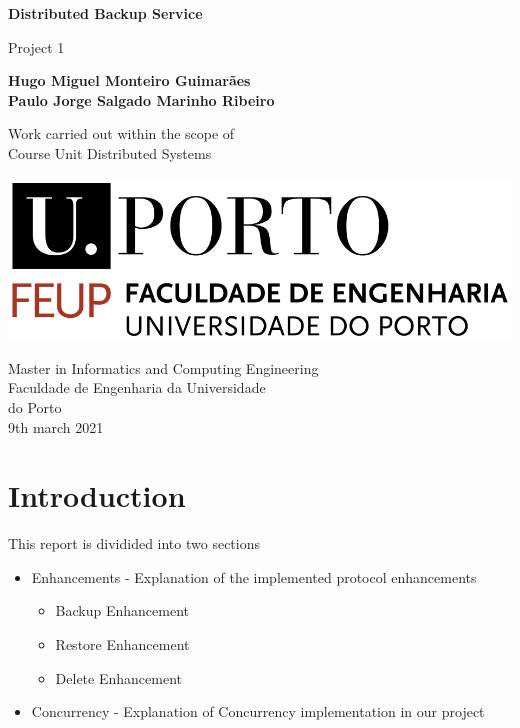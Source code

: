 \documentclass[11pt]{article}
\begin{document}
\begin{titlepage}
	\begin{center}
		\vspace*{1cm}
		
		\Large
		\textbf{Distributed Backup Service}
		
		\vspace{0.5cm}
		\large
		Project 1 
		
		\vspace{1.5cm}
		
		\textbf{Hugo Miguel Monteiro Guimarães}\\
		\textbf{Paulo Jorge Salgado Marinho Ribeiro}
		
		\vspace{4cm}
		
		Work carried out within the scope of \\
		Course Unit Distributed Systems
		
		\vspace{0.8cm}
		
		\includegraphics[width=0.4 \textwidth]{feup_logo.png}
		
		\vspace{1.5cm}		
		
		\large
		Master in Informatics and Computing Engineering\\
		Faculdade de Engenharia da Universidade\\
		do Porto\\
		9th march 2021
	
	\end{center}
\end{titlepage}


\pagebreak
\tableofcontents

\pagebreak

\section*{Introduction}
This report is dividided into two sections

\begin{itemize}
	\item Enhancements - Explanation of the implemented protocol enhancements
	\begin{itemize}
		\item Backup Enhancement  
		\item Restore Enhancement 
		\item Delete Enhancement 
	\end{itemize}
	\item Concurrency - Explanation of Concurrency implementation in our project
\end{itemize}
\end{document}
